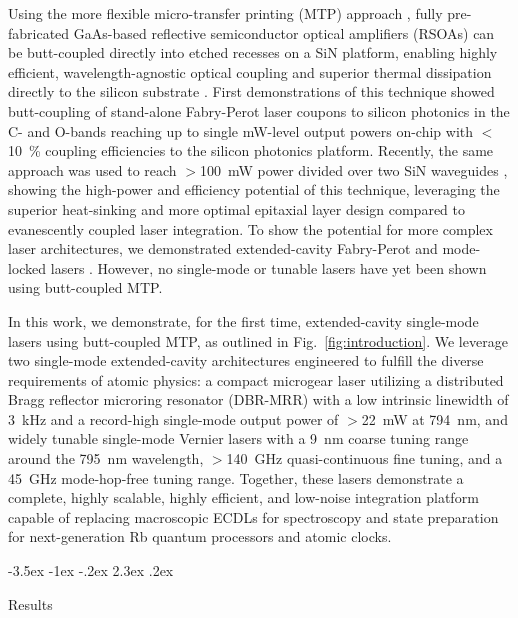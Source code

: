 \documentclass[%
 reprint,
 amsmath,amssymb,
 aps,
]{revtex4-2}
\makeatletter
\renewcommand\section{\@startsection {section}{1}{0pt}%
  {-3.5ex \@plus -1ex \@minus -.2ex}%
  {2.3ex \@plus.2ex}%
  {\normalfont\normalsize\bfseries\raggedright}}
\makeatother
\begin{document}
Using the more flexible micro-transfer printing (MTP) approach \cite{roelkens2024present, chen2026micro}, fully pre-fabricated GaAs-based reflective semiconductor optical amplifiers (RSOAs) can be butt-coupled directly into etched recesses on a SiN platform, enabling highly efficient, wavelength-agnostic optical coupling and superior thermal dissipation directly to the silicon substrate \cite{justice2012wafer, loi2018thermal}. First demonstrations of this technique showed butt-coupling of stand-alone Fabry-Perot laser coupons to silicon photonics in the C- and O-bands \cite{uzun2023integration, juvert2018integration} reaching up to single mW-level output powers on-chip with $<$10~\% coupling efficiencies to the silicon photonics platform. Recently, the same approach was used to reach $>$100~mW power divided over two SiN waveguides \cite{hu2026greater}, showing the high-power and efficiency potential of this technique, leveraging the superior heat-sinking and more optimal epitaxial layer design compared to evanescently coupled laser integration. To show the potential for more complex laser architectures, we demonstrated extended-cavity Fabry-Perot and mode-locked lasers \cite{kiewiet2026micro}. However, no single-mode or tunable lasers have yet been shown using butt-coupled MTP.

In this work, we demonstrate, for the first time, extended-cavity single-mode lasers using butt-coupled MTP, as outlined in Fig.~\ref{fig:introduction}. We leverage two single-mode extended-cavity architectures engineered to fulfill the diverse requirements of atomic physics: a compact microgear laser utilizing a distributed Bragg reflector microring resonator (DBR-MRR) with a low intrinsic linewidth of 3~kHz and a record-high single-mode output power of $>$22~mW at 794~nm, and widely tunable single-mode Vernier lasers with a 9~nm coarse tuning range around the 795~nm wavelength, $>$140~GHz quasi-continuous fine tuning, and a 45~GHz mode-hop-free tuning range. Together, these lasers demonstrate a complete, highly scalable, highly efficient, and low-noise integration platform capable of replacing macroscopic ECDLs for spectroscopy and state preparation for next-generation Rb quantum processors and atomic clocks.

\section{\label{sec:results} Results}
\end{document}
